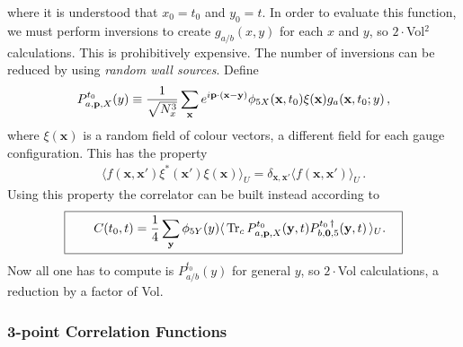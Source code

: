 where it is understood that $x_0=t_0$ and $y_0=t$. In order to evaluate this function, we must perform inversions to create $g_{a/b}(x,y)$ for each $x$ and $y$, so $2\cdot$Vol$^2$ calculations. This is prohibitively expensive. The number of inversions can be reduced by using {\it{random wall sources}}. Define
\begin{align}
  P^{t_0}_{a,{\textbf{p}},X}(y) \equiv {1\over \sqrt{N_x^3}} \sum_{\textbf{x}} e^{i{\textbf{p}}\cdot ({\textbf{x}}-{\textbf{y}})} \phi_{5X}({\textbf{x}},t_0) \xi({\textbf{x}}) g_a({\textbf{x}},t_0;y)\,,
  \label{eq:onesided_prop}
\end{align}
where $\xi({\textbf{x}})$ is a random field of colour vectors, a different field for each gauge configuration. This has the property
\begin{align}
  \langle f({\textbf{x}},{\textbf{x}}') \xi^*({\textbf{x}}')\xi({\textbf{x}})\rangle_U = \delta_{{\textbf{x}},{\textbf{x}}'} \langle f({\textbf{x}},{\textbf{x}}') \rangle_U\,.
\end{align}
Using this property the correlator can be built instead according to
\begin{align}
  \boxed{\quad  \quad C(t_0,t) = {1\over 4} \sum_{\textbf{y}} \phi_{5Y}(y) \langle \,\text{Tr}_c \, P^{t_0}_{a,{\textbf{p}},X}({\textbf{y}},t) P^{t_0\,\dagger}_{b,{\textbf{0}},5}({\textbf{y}},t) \,\rangle_U. \quad}
  \label{eq:tietogether}
\end{align}
Now all one has to compute is $P^{t_0}_{a/b}(y)$ for general $y$, so $2\cdot$Vol calculations, a reduction by a factor of Vol.

\subsubsection{3-point Correlation Functions}

